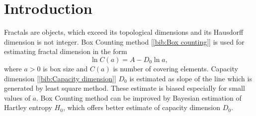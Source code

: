 
\section {Introduction }
Fractals are objects, which exceed its topological dimensions and its Hausdorff dimension is not integer. Box Counting method [\ref{bib:Box counting}] is used for estimating fractal dimension in the form
\begin{equation} 
\label{eq:boxcount}
\ln{C(a)} = A - D_{0}\ln{a},
\end{equation}
where $a>0$ is box size and $C(a)$ is number of covering elements. Capacity dimension [\ref{bib:Capacity dimension}] $D_{0}$ is estimated as slope of the line which is generated by least square method. These estimate is biased especially for small values of $a$. Box Counting method can be improved by Bayesian estimation of Hartley entropy $H_{0}$, which offers better estimate of capacity dimension $D_{0}$.
